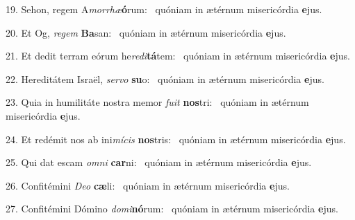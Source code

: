 19. Sehon, regem A\textit{mor}\textit{rhæ}\textbf{ó}rum: \ast\  quóniam in ætérnum misericórdia \textbf{e}jus.\

20. Et Og, \textit{re}\textit{gem} \textbf{Ba}san: \ast\  quóniam in ætérnum misericórdia \textbf{e}jus.\

21. Et dedit terram eórum he\textit{re}\textit{di}\textbf{tá}tem: \ast\  quóniam in ætérnum misericórdia \textbf{e}jus.\

22. Hereditátem Israël, \textit{ser}\textit{vo} \textbf{su}o: \ast\  quóniam in ætérnum misericórdia \textbf{e}jus.\

23. Quia in humilitáte nostra memor \textit{fu}\textit{it} \textbf{nos}tri: \ast\  quóniam in ætérnum misericórdia \textbf{e}jus.\

24. Et redémit nos ab ini\textit{mí}\textit{cis} \textbf{nos}tris: \ast\  quóniam in ætérnum misericórdia \textbf{e}jus.\

25. Qui dat escam \textit{om}\textit{ni} \textbf{car}ni: \ast\  quóniam in ætérnum misericórdia \textbf{e}jus.\

26. Confitémini \textit{De}\textit{o} \textbf{cæ}li: \ast\  quóniam in ætérnum misericórdia \textbf{e}jus.\

27. Confitémini Dómino \textit{do}\textit{mi}\textbf{nó}rum: \ast\  quóniam in ætérnum misericórdia \textbf{e}jus.\

